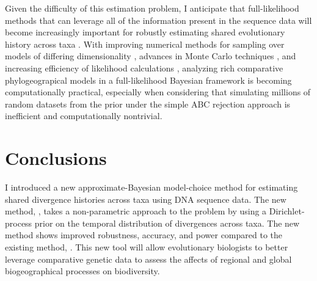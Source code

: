 
Given the difficulty of this estimation problem, I anticipate that
full-likelihood methods that can leverage all of the information present in the
sequence data will become increasingly important for robustly estimating shared
evolutionary history across taxa \cite{JeetDiss}.
With improving numerical methods for sampling over models of differing
dimensionality \cite{Green1995,Lemey2009}, advances in Monte Carlo techniques
\cite{Jordan2012}, and increasing efficiency of likelihood calculations
\cite{Ayres2012}, analyzing rich comparative phylogeograpical models in a
full-likelihood Bayesian framework is becoming computationally practical,
especially when considering that simulating millions of random datasets from
the prior under the simple ABC rejection approach is inefficient and
computationally nontrivial.

\section{Conclusions}
I introduced a new approximate-Bayesian model-choice method for estimating
shared divergence histories across taxa using DNA sequence data.
The new method, \dppmsbayes, takes a non-parametric approach to the problem by
using a Dirichlet-process prior on the temporal distribution of divergences
across taxa.
The new method shows improved robustness, accuracy, and power compared to the
existing method, \msb.
This new tool will allow evolutionary biologists to better leverage comparative
genetic data to assess the affects of regional and global biogeographical
processes on biodiversity.

